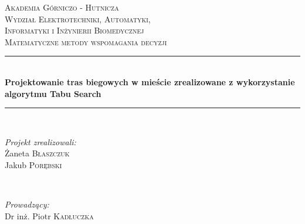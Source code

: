 \begin{titlepage}

\newcommand{\HRule}{\rule{\linewidth}{0.5mm}} %

\center %
 

\textsc{\LARGE Akademia Górniczo - Hutnicza}\\[1.5cm] %
\textsc{\Large Wydział Elektrotechniki, Automatyki,\protect\\[-1mm] Informatyki i Inżynierii Biomedycznej}\\[0.5cm] %
\textsc{\large Matematyczne metody wspomagania decyzji}\\[0.5cm] %


\HRule \\[0.4cm]
{ \huge \bfseries Projektowanie tras biegowych w mieście zrealizowane z wykorzystanie algorytmu Tabu Search}\\[0.4cm] %
\HRule \\[1.5cm]
 

\begin{minipage}{0.4\textwidth}
\begin{flushleft} \large
\emph{Projekt zrealizowali:}\\
Żaneta \textsc{Błaszczuk} \\ %
Jakub \textsc{Porębski}
\end{flushleft}
\end{minipage}
~
\begin{minipage}{0.5\textwidth} %
\begin{flushright} \large
\emph{Prowadzący:} \\
Dr inż. Piotr \textsc{Kadłuczka} %
\end{flushright}
\end{minipage}\\[1cm]


\end{titlepage}
